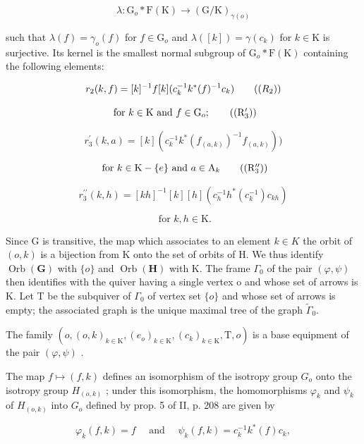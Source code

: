\[
\lambda \colon \mathrm{G} _ {o} * \mathrm{F} (\mathrm{K}) \to (\mathrm{G} / \mathrm{K}) _ {\gamma (o)}
\]

such that \(\lambda(f) = \gamma_o(f)\) for \(f \in \mathrm{G}_o\) and \(\lambda([k]) = \gamma(c_k)\) for \(k \in \mathrm{K}\) is surjective. Its kernel is the smallest normal subgroup of \(\mathrm{G}_o * \mathrm{F}(\mathrm{K})\) containing the following elements:

\[
r _ {2} (k, f) = [ k ] ^ {- 1} f [ k ] (c _ {k} ^ {- 1} k ^ {*} (f) ^ {- 1} c _ {k})\tag{\((R_{2})\)}
\]

\[
\text { for } k \in \mathrm{K} \text { and } f \in \mathrm{G} _ {o};\tag{\((\mathrm{R}_{3}^{\prime})\)}
\]

\[
r _ {3} ^ {\prime} (k, a) = [ k ] (c _ {k} ^ {- 1} k ^ {*} (f _ {(a, k)}) ^ {- 1} f _ {(a, k)}))
\]

\[
\text { for } k \in \mathrm{K} - \{e \} \text { and } a \in \mathrm{A} _{k}\tag{\((\mathrm{R}_{3}^{\prime\prime})\)}
\]

\[
r _ {3} ^ {\prime \prime} (k, h) = [ k h ] ^ {- 1} [ k ] [ h ] (c _ {h} ^ {- 1} h ^ {*} (c _ {k} ^ {- 1}) c _ {k h})
\]

\[
\text { for } k,h \in \mathrm{K}.
\]

Since G is transitive, the map which associates to an element \(k \in K\) the orbit of \((o, k)\) is a bijection from K onto the set of orbits of H. We thus identify \(\operatorname{Orb}(\mathbf{G})\) with \(\{o\}\) and \(\operatorname{Orb}(\mathbf{H})\) with K. The frame \(\Gamma_{0}\) of the pair \((\varphi, \psi)\) then identifies with the quiver having a single vertex o and whose set of arrows is K. Let T be the subquiver of \(\Gamma_{0}\) of vertex set \(\{o\}\) and whose set of arrows is empty; the associated graph is the unique maximal tree of the graph \(\widetilde{\Gamma}_{0}\).

The family \((o,(o,k)_{k\in \mathrm{K}},(e_o)_{k\in \mathrm{K}},(c_k)_{k\in \mathrm{K}},\mathrm{T},o)\) is a base equipment of the pair \((\varphi ,\psi)\) .

The map \(f \mapsto (f, k)\) defines an isomorphism of the isotropy group \(G_o\) onto the isotropy group \(H_{(o,k)}\) ; under this isomorphism, the homomorphisms \(\varphi_k\) and \(\psi_k\) of \(H_{(o,k)}\) into \(G_o\) defined by prop. 5 of II, p. 208 are given by

\[
\varphi_ {k} (f, k) = f \quad \text { and } \quad \psi_ {k} (f, k) = c _ {k} ^ {- 1} k ^ {*} (f) c _ {k},\tag{3}
\]

